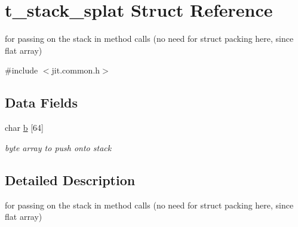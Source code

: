 \hypertarget{structt__stack__splat}{
\section{t\_\-stack\_\-splat Struct Reference}
\label{structt__stack__splat}
}


for passing on the stack in method calls (no need for struct packing here, since flat array)  


{\ttfamily \#include $<$jit.common.h$>$}\subsection*{Data Fields}
\begin{DoxyCompactItemize}
\item 
\hypertarget{structt__stack__splat_a0d1cfa6f4e0df1480c5c958290f754e4}{
char \hyperlink{structt__stack__splat_a0d1cfa6f4e0df1480c5c958290f754e4}{b} \mbox{[}64\mbox{]}}
\label{structt__stack__splat_a0d1cfa6f4e0df1480c5c958290f754e4}

\begin{DoxyCompactList}\small\item\em byte array to push onto stack \item\end{DoxyCompactList}\end{DoxyCompactItemize}


\subsection{Detailed Description}
for passing on the stack in method calls (no need for struct packing here, since flat array) 